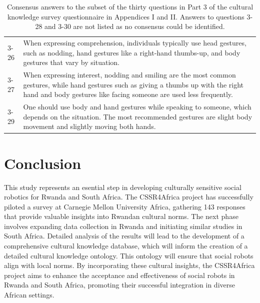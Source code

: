 \documentclass{CSSRforAfrica}
\begin{document}
\begin{table}[H]
\begin{center}
\begin{tabularx}{\linewidth}{|l|X|}
{\small 3-26 } & {\small When expressing comprehension, individuals typically use head gestures, such as nodding, hand gestures like a right-hand thumbs-up, and body gestures that vary by situation.} \\

{\small 3-27 } & {\small When expressing interest, nodding and smiling are the most common gestures, while hand gestures such as giving a thumbs up with the right hand and body gestures like facing someone are used less frequently.} \\

{\small 3-29 } & {\small One should use body and hand gestures while speaking to someone, which depends on the situation. The most recommended gestures are slight body movement and slightly moving both hands.} \\
\hline \hline
\end{tabularx}
\end{center}
\vspace{-5mm}
\caption{ Consensus answers to the subset of the thirty questions in Part 3 of the cultural knowledge survey questionnaire in Appendices I and II. Answers to questions 3-28 and 3-30 are not listed as no consensus could be identified.}
\label{table:AllAnswers3}
\end{table}


\section{Conclusion}
 \label{section:conclusion}

This study represents an esential  step in developing culturally sensitive social robotics for Rwanda and South Africa. The CSSR4Africa project has successfully piloted a survey at Carnegie Mellon University Africa, gathering 143 responses   that provide valuable insights into Rwandan cultural norms. The next phase involves expanding data collection in Rwanda and initiating similar studies in South Africa. Detailed analysis of the results will lead to the development of a comprehensive cultural knowledge database, which will inform the creation of a detailed cultural knowledge ontology. This ontology will ensure that social robots align with local norms. By incorporating these cultural insights, the CSSR4Africa project aims to enhance the acceptance and effectiveness of social robots in Rwanda and South Africa, promoting their successful integration in diverse African settings.
\end{document}

